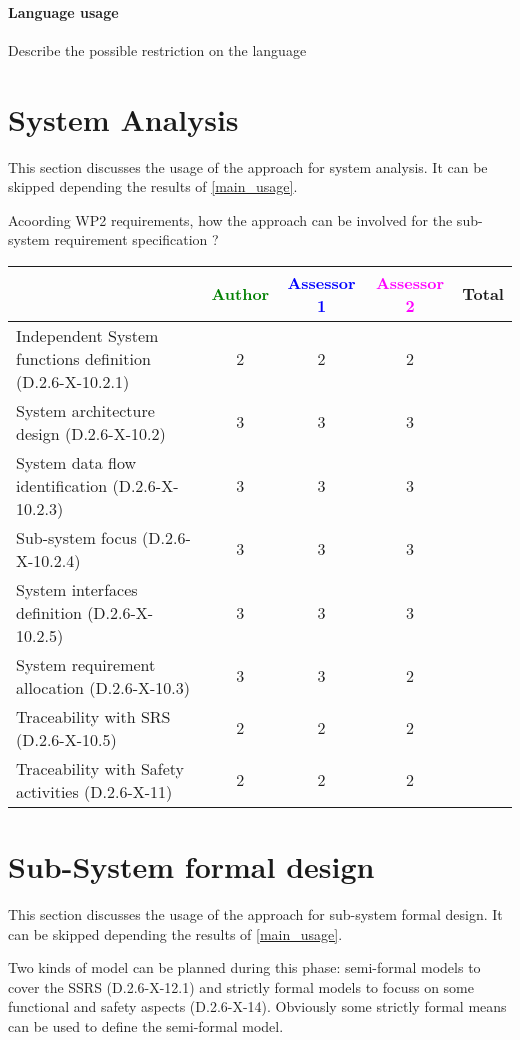 \paragraph{Language usage} Describe the possible restriction on the language

\section{System Analysis}
This section discusses the usage of the approach for system analysis.
It can be skipped depending the results of \ref{main_usage}.

Acoording WP2 requirements, how the approach can be involved for the sub-system requirement specification ?

\begin{tabular}{|l | c | c | c | c|}
\hline
& \textcolor{green}{Author} & \textcolor{blue}{Assessor 1} & \textcolor{magenta}{Assessor 2} & Total \\
\hline
Independent System functions definition (D.2.6-X-10.2.1)  &2 &2 & 2&  \\
\hline 
System architecture design (D.2.6-X-10.2) &3 &3 & 3&  \\
\hline
System data flow identification (D.2.6-X-10.2.3)  &3 &3 & 3&  \\
\hline
Sub-system focus (D.2.6-X-10.2.4)  &3 &3 & 3&  \\
\hline
System interfaces definition (D.2.6-X-10.2.5)  &3 &3 & 3&  \\
\hline
System requirement allocation (D.2.6-X-10.3)  &3 &3 & 2&  \\
\hline
Traceability with SRS (D.2.6-X-10.5)  &2 &2 & 2&  \\
\hline
Traceability with Safety activities (D.2.6-X-11)  &2 &2 & 2 &  \\
\hline
\end{tabular}



\section{Sub-System formal design}
This section discusses the usage of the approach for sub-system formal design.
It can be skipped depending the results of \ref{main_usage}.

Two kinds of model can be planned during this phase: semi-formal models to  cover the SSRS (D.2.6-X-12.1) and strictly formal  models to  focuss on some functional and safety aspects (D.2.6-X-14).  Obviously some strictly  formal means can be used to define the semi-formal  model.

